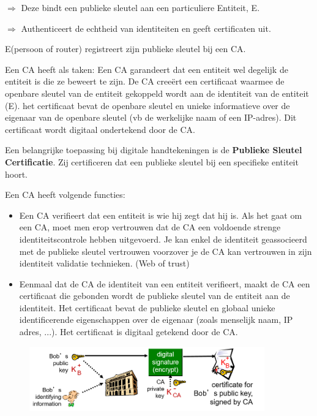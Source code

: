 
\noindent $\Rightarrow$ Deze bindt een publieke sleutel aan een particuliere Entiteit, E.

\noindent $\Rightarrow$ Authenticeert de echtheid van identiteiten en geeft certificaten uit.

\noindent E(persoon of router) registreert zijn publieke sleutel bij een CA.

\noindent Een CA heeft als taken:
\bi
\itf Een CA garandeert dat een entiteit wel degelijk de entiteit is die ze beweert te zijn.
\itf De CA creeërt een certificaat waarmee de openbare sleutel van de entiteit gekoppeld wordt aan de identiteit van de entiteit (E).
    \bi
    \itf het certificaat bevat de openbare sleutel en unieke informatieve over de eigenaar van de openbare sleutel (vb de werkelijke naam of een IP-adres). Dit certificaat wordt digitaal ondertekend door de CA. 
    \ei
\ei


Een belangrijke toepassing bij digitale handtekeningen is de \textbf{Publieke Sleutel Certificatie}. Zij certificeren dat een publieke sleutel bij een specifieke entiteit hoort.

\noindent Een CA heeft volgende functies:
\begin{itemize}
\item Een CA verifieert dat een entiteit is wie hij zegt dat hij is. Als het gaat om een CA, moet men erop vertrouwen dat de CA een voldoende strenge identiteitscontrole hebben uitgevoerd. Je kan enkel de identiteit geassocieerd met de publieke sleutel vertrouwen voorzover je de CA kan vertrouwen in zijn identiteit validatie technieken. (Web of trust)
\item Eenmaal dat de CA de identiteit van een entiteit verifieert, maakt de CA een certificaat die gebonden wordt de publieke sleutel van de entiteit aan de identiteit. Het certificaat bevat de publieke sleutel en globaal unieke identificerende eigenschappen over de eigenaar (zoals menselijk naam, IP adres, ...). Het certificaat is digitaal getekend door de CA.
\end{itemize}

\begin{figure}[h]
    \centering
    \includegraphics[width=4in]{./img/imghfdst8/hfdst8puntje11.png}
    \caption{ }      
    \label{fig: }
\end{figure}

